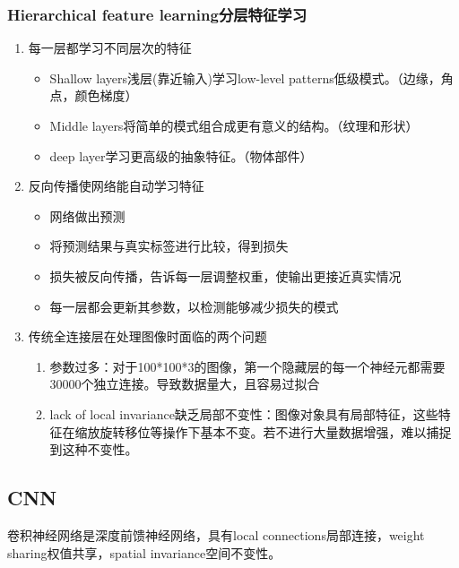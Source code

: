 \documentclass[UTF8]{ctexart}
\begin{document}
\subsubsection{Hierarchical feature learning分层特征学习}
\begin{enumerate}
    \item 每一层都学习不同层次的特征
    
    \begin{itemize}
        \item Shallow layers浅层(靠近输入)学习low-level patterns低级模式。（边缘，角点，颜色梯度）
        \item Middle layers将简单的模式组合成更有意义的结构。（纹理和形状）
        \item deep layer学习更高级的抽象特征。（物体部件）
    \end{itemize}

    \item 反向传播使网络能自动学习特征
    \begin{itemize}
        \item 网络做出预测
        \item 将预测结果与真实标签进行比较，得到损失
        \item 损失被反向传播，告诉每一层调整权重，使输出更接近真实情况
        \item 每一层都会更新其参数，以检测能够减少损失的模式
    \end{itemize}
    
    \item 传统全连接层在处理图像时面临的两个问题
    \begin{enumerate}
        \item 参数过多：对于100*100*3的图像，第一个隐藏层的每一个神经元都需要30000个独立连接。导致数据量大，且容易过拟合
        \item lack of local invariance缺乏局部不变性：图像对象具有局部特征，这些特征在缩放旋转移位等操作下基本不变。若不进行大量数据增强，难以捕捉到这种不变性。
    \end{enumerate}
\end{enumerate}

\subsection{CNN}
卷积神经网络是深度前馈神经网络，具有local connections局部连接，weight sharing权值共享，spatial invariance空间不变性。
\end{document}
